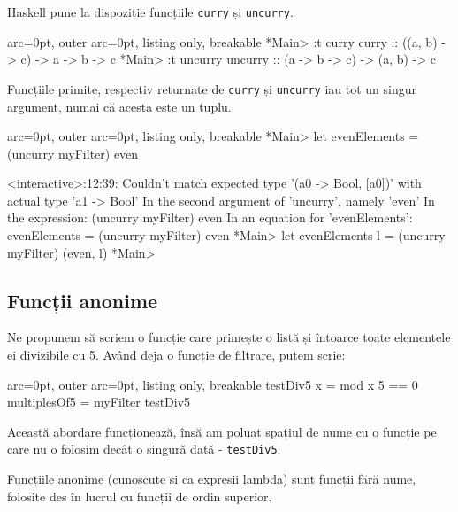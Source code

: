 \begin{tcolorbox}[colback=blue!10, colframe=blue!20]
Haskell pune la dispoziție funcțiile \texttt{curry} și \texttt{uncurry}. 


\begin{tcblisting}{ arc=0pt, outer arc=0pt, listing only, breakable}
*Main> :t curry
curry :: ((a, b) -> c) -> a -> b -> c
*Main> :t uncurry
uncurry :: (a -> b -> c) -> (a, b) -> c

\end{tcblisting}


Funcțiile primite, respectiv returnate de \texttt{curry} și \texttt{uncurry} iau tot un singur argument, numai că acesta este un tuplu.


\begin{tcblisting}{ arc=0pt, outer arc=0pt, listing only, breakable}
*Main> let evenElements = (uncurry myFilter) even

<interactive>:12:39:
    Couldn't match expected type '(a0 -> Bool, [a0])'
                with actual type 'a1 -> Bool'
    In the second argument of 'uncurry', namely 'even'
    In the expression: (uncurry myFilter) even
    In an equation for 'evenElements':
        evenElements = (uncurry myFilter) even
*Main> let evenElements l = (uncurry myFilter) (even, l)
*Main>

\end{tcblisting}

\end{tcolorbox}

\subsection*{ Funcții anonime }

Ne propunem să scriem o funcție care primește o listă și întoarce toate elementele ei divizibile cu 5. Având deja o funcție de filtrare, putem scrie:


\begin{tcblisting}{ arc=0pt, outer arc=0pt, listing only, breakable}
testDiv5 x = mod x 5 == 0
multiplesOf5 = myFilter testDiv5

\end{tcblisting}


Această abordare funcționează, însă am poluat spațiul de nume cu o funcție pe care nu o folosim decât o singură dată - \texttt{testDiv5}.

Funcțiile anonime (cunoscute și ca expresii lambda) sunt funcții fără nume, folosite des în lucrul cu funcții de ordin superior.

